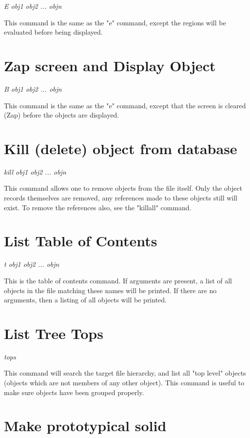 {\em \center
E obj1 obj2 ... objn
}

This command is the same as the "e" command, except the regions will
be evaluated before being displayed.

\section{Zap screen and Display Object}

{\em \center
B obj1 obj2 ... objn
}

This command is the same as the "e" command, except that the screen
is cleared (Zap) before the objects are displayed.

\section{Kill (delete) object from database}

{\em \center
kill obj1 obj2 ... objn
}

This command allows one to remove objects from the file itself.
Only the object records themselves are removed, any references made
to these objects still will exist.
To remove the references also, see the "killall" command.

\section{List Table of Contents}

{\em \center
t obj1 obj2 ... objn
}

This is the table of contents command.  If arguments are present, a list
of all objects in the file matching these names will be printed.
If there are no arguments, then a listing of all objects will be printed.

\section{List Tree Tops}

{\em \center
tops
}

This command will search the target file hierarchy, and list all "top level"
objects (objects which are not members of any other object).
This command is useful to make sure objects have been grouped properly.

\section{Make prototypical solid}

